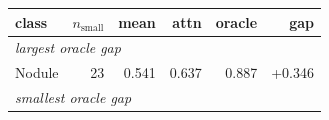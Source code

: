 \begin{tabular}{lrrrrr}
\toprule
class & $n_{\mathrm{small}}$ & mean & attn & oracle & gap \\
\midrule
\multicolumn{6}{l}{\emph{largest oracle gap}} \\
Nodule & 23 & 0.541 & 0.637 & 0.887 & +0.346 \\
\midrule
\multicolumn{6}{l}{\emph{smallest oracle gap}} \\
\bottomrule
\end{tabular}
